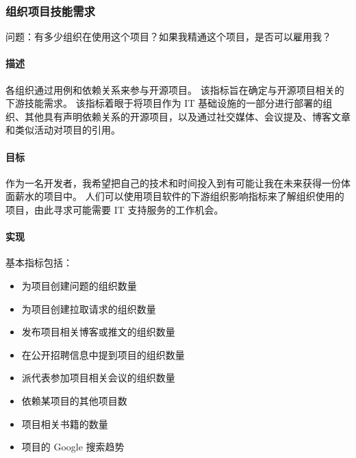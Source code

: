 \hypertarget{ux7ec4ux7ec7ux9879ux76eeux6280ux80fdux9700ux6c42}{%
\subsubsection{组织项目技能需求}\label{ux7ec4ux7ec7ux9879ux76eeux6280ux80fdux9700ux6c42}}

问题：有多少组织在使用这个项目？如果我精通这个项目，是否可以雇用我？

\hypertarget{ux63cfux8ff0}{%
\paragraph{描述}\label{ux63cfux8ff0}}

各组织通过用例和依赖关系来参与开源项目。
该指标旨在确定与开源项目相关的下游技能需求。 该指标着眼于将项目作为 IT
基础设施的一部分进行部署的组织、其他具有声明依赖关系的开源项目，以及通过社交媒体、会议提及、博客文章和类似活动对项目的引用。

\hypertarget{ux76eeux6807}{%
\paragraph{目标}\label{ux76eeux6807}}

作为一名开发者，我希望把自己的技术和时间投入到有可能让我在未来获得一份体面薪水的项目中。
人们可以使用项目软件的下游组织影响指标来了解组织使用的项目，由此寻求可能需要
IT 支持服务的工作机会。

\hypertarget{ux5b9eux73b0}{%
\paragraph{实现}\label{ux5b9eux73b0}}

基本指标包括：

\begin{itemize}
\tightlist
\item
  为项目创建问题的组织数量
\item
  为项目创建拉取请求的组织数量
\item
  发布项目相关博客或推文的组织数量
\item
  在公开招聘信息中提到项目的组织数量
\item
  派代表参加项目相关会议的组织数量
\item
  依赖某项目的其他项目数
\item
  项目相关书籍的数量
\item
  项目的 Google 搜索趋势
\end{itemize}

